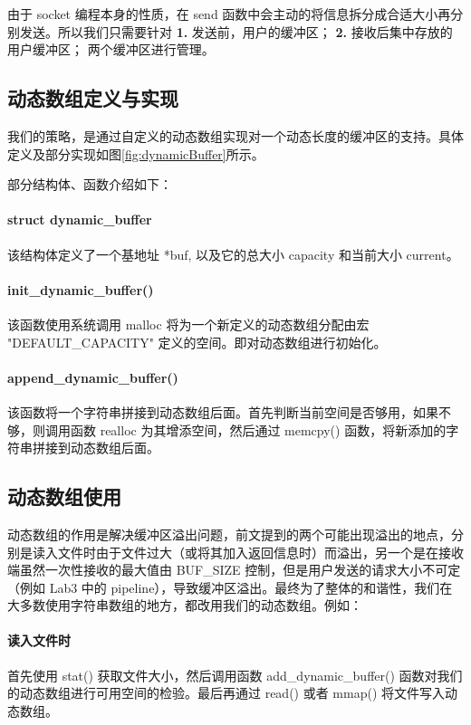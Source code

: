 由于 socket 编程本身的性质，在 send 函数中会主动的将信息拆分成合适大小再分别发送。所以我们只需要针对 \textbf{1.} 发送前，用户的缓冲区； \textbf{2.} 接收后集中存放的用户缓冲区； 两个缓冲区进行管理。

\subsection{动态数组定义与实现}
我们的策略，是通过自定义的动态数组实现对一个动态长度的缓冲区的支持。具体定义及部分实现如图\ref{fig:dynamicBuffer}所示。


部分结构体、函数介绍如下：

\paragraph*{struct dynamic\_buffer} 该结构体定义了一个基地址 *buf, 以及它的总大小 capacity 和当前大小 current。

\paragraph*{init\_dynamic\_buffer()} 该函数使用系统调用 malloc 将为一个新定义的动态数组分配由宏 "DEFAULT\_CAPACITY" 定义的空间。即对动态数组进行初始化。

\paragraph*{append\_dynamic\_buffer()} 该函数将一个字符串拼接到动态数组后面。首先判断当前空间是否够用，如果不够，则调用函数 realloc 为其增添空间，然后通过 memcpy() 函数，将新添加的字符串拼接到动态数组后面。


\subsection{动态数组使用}

动态数组的作用是解决缓冲区溢出问题，前文提到的两个可能出现溢出的地点，分别是读入文件时由于文件过大（或将其加入返回信息时）而溢出，另一个是在接收端虽然一次性接收的最大值由 BUF\_SIZE 控制，但是用户发送的请求大小不可定（例如 Lab3 中的 pipeline），导致缓冲区溢出。最终为了整体的和谐性，我们在大多数使用字符串数组的地方，都改用我们的动态数组。例如：

\paragraph*{读入文件时} 首先使用 stat() 获取文件大小，然后调用函数 add\_dynamic\_buffer() 函数对我们的动态数组进行可用空间的检验。最后再通过 read() 或者 mmap() 将文件写入动态数组。

